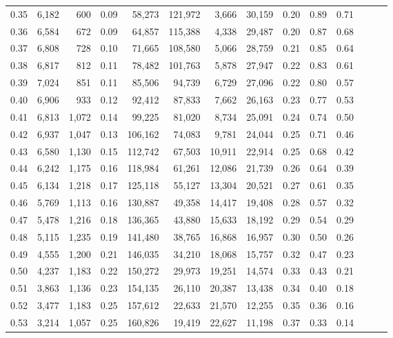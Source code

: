 \begin{tabular}{rrrrrrrrrrrrrr}
0.35 &  6,182 &    600 &  0.09 &   58,273 &  121,972 &   3,666 &  30,159 &  0.20 &  0.89 &      0.71 \\
0.36 &  6,584 &    672 &  0.09 &   64,857 &  115,388 &   4,338 &  29,487 &  0.20 &  0.87 &      0.68 \\
0.37 &  6,808 &    728 &  0.10 &   71,665 &  108,580 &   5,066 &  28,759 &  0.21 &  0.85 &      0.64 \\
0.38 &  6,817 &    812 &  0.11 &   78,482 &  101,763 &   5,878 &  27,947 &  0.22 &  0.83 &      0.61 \\
0.39 &  7,024 &    851 &  0.11 &   85,506 &   94,739 &   6,729 &  27,096 &  0.22 &  0.80 &      0.57 \\
0.40 &  6,906 &    933 &  0.12 &   92,412 &   87,833 &   7,662 &  26,163 &  0.23 &  0.77 &      0.53 \\
0.41 &  6,813 &  1,072 &  0.14 &   99,225 &   81,020 &   8,734 &  25,091 &  0.24 &  0.74 &      0.50 \\
0.42 &  6,937 &  1,047 &  0.13 &  106,162 &   74,083 &   9,781 &  24,044 &  0.25 &  0.71 &      0.46 \\
0.43 &  6,580 &  1,130 &  0.15 &  112,742 &   67,503 &  10,911 &  22,914 &  0.25 &  0.68 &      0.42 \\
0.44 &  6,242 &  1,175 &  0.16 &  118,984 &   61,261 &  12,086 &  21,739 &  0.26 &  0.64 &      0.39 \\
0.45 &  6,134 &  1,218 &  0.17 &  125,118 &   55,127 &  13,304 &  20,521 &  0.27 &  0.61 &      0.35 \\
0.46 &  5,769 &  1,113 &  0.16 &  130,887 &   49,358 &  14,417 &  19,408 &  0.28 &  0.57 &      0.32 \\
0.47 &  5,478 &  1,216 &  0.18 &  136,365 &   43,880 &  15,633 &  18,192 &  0.29 &  0.54 &      0.29 \\
0.48 &  5,115 &  1,235 &  0.19 &  141,480 &   38,765 &  16,868 &  16,957 &  0.30 &  0.50 &      0.26 \\
0.49 &  4,555 &  1,200 &  0.21 &  146,035 &   34,210 &  18,068 &  15,757 &  0.32 &  0.47 &      0.23 \\
0.50 &  4,237 &  1,183 &  0.22 &  150,272 &   29,973 &  19,251 &  14,574 &  0.33 &  0.43 &      0.21 \\
0.51 &  3,863 &  1,136 &  0.23 &  154,135 &   26,110 &  20,387 &  13,438 &  0.34 &  0.40 &      0.18 \\
0.52 &  3,477 &  1,183 &  0.25 &  157,612 &   22,633 &  21,570 &  12,255 &  0.35 &  0.36 &      0.16 \\
0.53 &  3,214 &  1,057 &  0.25 &  160,826 &   19,419 &  22,627 &  11,198 &  0.37 &  0.33 &      0.14 \\

\end{tabular}
